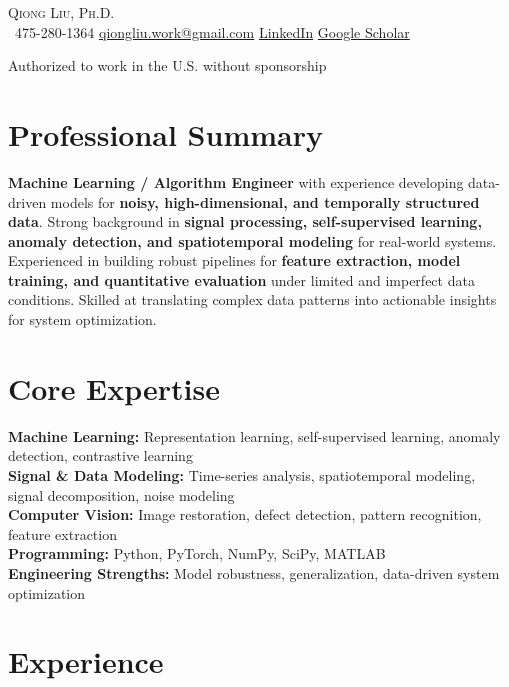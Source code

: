 \begin{center}
{\Huge \scshape Qiong Liu, Ph.D.} \\ \vspace{4pt}
\small
\faPhone\ 475-280-1364 \quad
\href{mailto:qiongliu.work@gmail.com}{qiongliu.work@gmail.com} \quad
\href{https://www.linkedin.com/in/qiong-l-529b23196}{LinkedIn} \quad
\href{https://scholar.google.com/citations?user=SvnpHCkAAAAJ&hl=en}{Google Scholar}

Authorized to work in the U.S. without sponsorship
\end{center}

\section{Professional Summary}
\textbf{Machine Learning / Algorithm Engineer} with experience developing data-driven models for \textbf{noisy, high-dimensional, and temporally structured data}. Strong background in \textbf{signal processing, self-supervised learning, anomaly detection, and spatiotemporal modeling} for real-world systems. Experienced in building robust pipelines for \textbf{feature extraction, model training, and quantitative evaluation} under limited and imperfect data conditions. Skilled at translating complex data patterns into actionable insights for system optimization.

\section{Core Expertise}
\textbf{Machine Learning:} Representation learning, self-supervised learning, anomaly detection, contrastive learning \\
\textbf{Signal \& Data Modeling:} Time-series analysis, spatiotemporal modeling, signal decomposition, noise modeling \\
\textbf{Computer Vision:} Image restoration, defect detection, pattern recognition, feature extraction \\
\textbf{Programming:} Python, PyTorch, NumPy, SciPy, MATLAB \\
\textbf{Engineering Strengths:} Model robustness, generalization, data-driven system optimization

\section{Experience}

